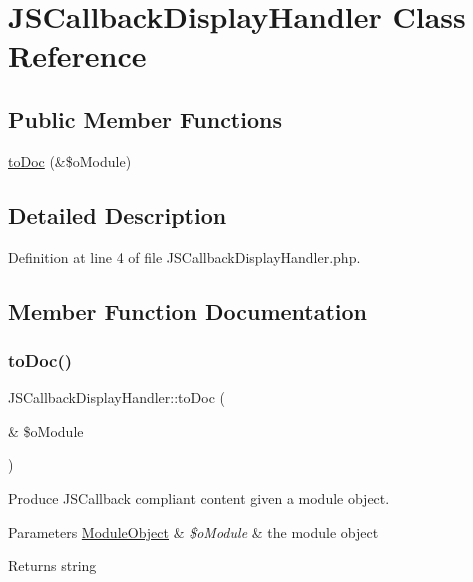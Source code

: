 \hypertarget{classJSCallbackDisplayHandler}{}\section{J\+S\+Callback\+Display\+Handler Class Reference}
\label{classJSCallbackDisplayHandler}
\subsection*{Public Member Functions}
\begin{DoxyCompactItemize}
\item 
\hyperlink{classJSCallbackDisplayHandler_af9bbdda903e76c61d097bc20aecc73d5}{to\+Doc} (\&\$o\+Module)
\end{DoxyCompactItemize}


\subsection{Detailed Description}


Definition at line 4 of file J\+S\+Callback\+Display\+Handler.\+php.



\subsection{Member Function Documentation}
\hypertarget{classJSCallbackDisplayHandler_af9bbdda903e76c61d097bc20aecc73d5}{}\label{classJSCallbackDisplayHandler_af9bbdda903e76c61d097bc20aecc73d5} 
\subsubsection{\texorpdfstring{to\+Doc()}{toDoc()}}
{\footnotesize\ttfamily J\+S\+Callback\+Display\+Handler\+::to\+Doc (\begin{DoxyParamCaption}\item[{\&}]{\$o\+Module }\end{DoxyParamCaption})}

Produce J\+S\+Callback compliant content given a module object.~\newline

\begin{DoxyParams}[1]{Parameters}
\hyperlink{classModuleObject}{Module\+Object} & {\em \$o\+Module} & the module object \\
\hline
\end{DoxyParams}
\begin{DoxyReturn}{Returns}
string 
\end{DoxyReturn}


